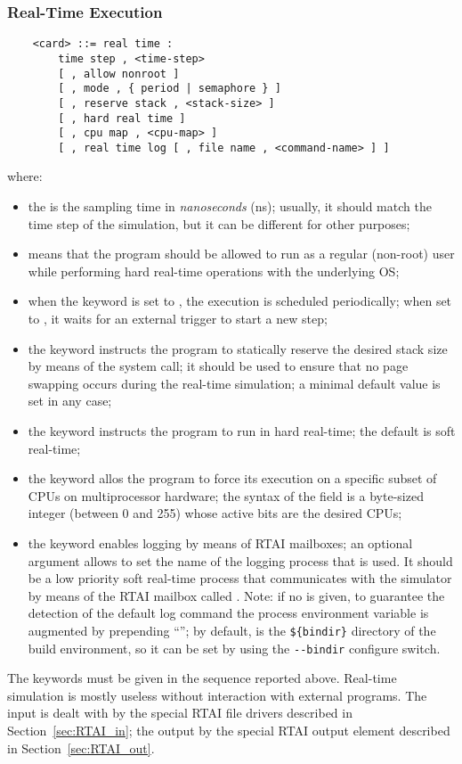 \subsubsection{Real-Time Execution}\label{sec:REAL-TIME}
\begin{verbatim}
    <card> ::= real time :
        time step , <time-step> 
        [ , allow nonroot ]
        [ , mode , { period | semaphore } ]
        [ , reserve stack , <stack-size> ]
        [ , hard real time ]
        [ , cpu map , <cpu-map> ]
        [ , real time log [ , file name , <command-name> ] ]
\end{verbatim}
where:
\begin{itemize}
\item the  is the sampling time in \emph{nanoseconds} (ns); 
usually, it should match the time step 
of the simulation, but it can be different for other purposes;
\item {} means that the program should be allowed to run
as a regular (non-root) user while performing hard real-time operations
with the underlying OS;
\item when the keyword  is set to , the execution
is scheduled periodically; when set to , it waits 
for an external trigger to start a new step;
\item the keyword  instructs the program 
to statically reserve the desired stack size by means 
of the  system call; it should be used to ensure 
that no page swapping occurs during the real-time simulation;
a minimal default value is set in any case;
\item the keyword  instructs the program to run
in hard real-time; the default is soft real-time;
\item the keyword  allos the program to force its
execution on a specific subset of CPUs on multiprocessor hardware;
the syntax of the  field is a byte-sized integer 
(between 0 and 255) whose active bits are the desired CPUs;
\item the keyword  enables logging by means 
of RTAI mailboxes; an optional  argument allows 
to set the name of the logging process that is used.
It should be a low priority soft real-time process that communicates
with the simulator by means of the RTAI mailbox called .
Note: if no  is given, to guarantee the detection 
of the default log command the process  environment variable 
is augmented by prepending ``''; by default,
 is the \verb;${bindir}; directory of the build environment,
so it can be set by using the \verb;--bindir; configure switch.
\end{itemize}
The keywords must be given in the sequence reported above.
Real-time simulation is mostly useless without interaction 
with external programs.
The input is dealt with by the special RTAI file drivers described
in Section~\ref{sec:RTAI_in}; the output by the special RTAI output
element described in Section~\ref{sec:RTAI_out}.



